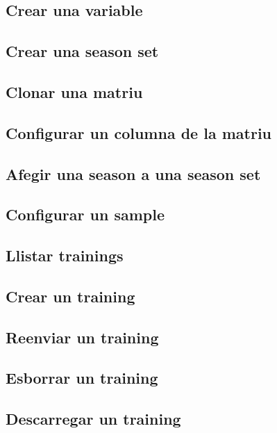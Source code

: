 \subsection{Crear una variable}

\subsection{Crear una season set}

\subsection{Clonar una matriu}

\subsection{Configurar un columna de la matriu}

\subsection{Afegir una season a una season set}

\subsection{Configurar un sample}

\subsection{Llistar trainings}

\subsection{Crear un training}

\subsection{Reenviar un training}

\subsection{Esborrar un training}

\subsection{Descarregar un training}


